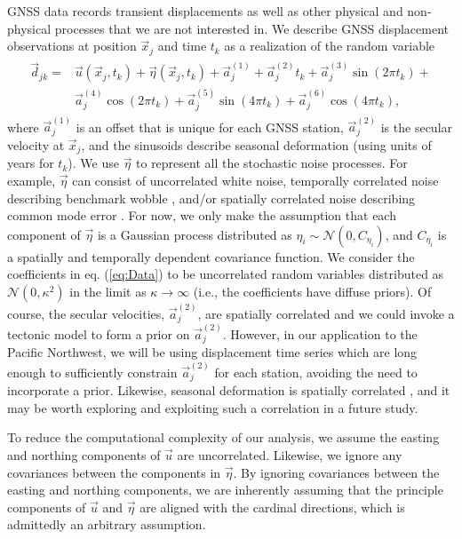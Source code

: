 \documentclass[extra,mreferee]{gji}
\begin{document}
GNSS data records transient displacements as well as other physical and non-physical processes that we are not interested in. We describe GNSS displacement observations at position $\vec{x}_j$ and time $t_k$ as a realization of the random variable 
\begin{align}\label{eq:Data}
\begin{split}
\vec{d}_{jk} = &\vec{u}(\vec{x}_j,t_k) + \vec{\eta}(\vec{x}_j,t_k) + \vec{a}^{(1)}_j + \vec{a}^{(2)}_jt_k + \vec{a}^{(3)}_j\sin(2 \pi t_k) + \\ 
               &\vec{a}^{(4)}_j\cos(2 \pi t_k) + \vec{a}^{(5)}_j\sin(4 \pi t_k) + \vec{a}^{(6)}_j\cos(4 \pi t_k), 
\end{split}
\end{align}
where $\vec{a}^{(1)}_j$ is an offset that is unique for each GNSS station, $\vec{a}^{(2)}_j$ is the secular velocity at $\vec{x}_j$, and the sinusoids describe seasonal deformation (using units of years for $t_k$). We use $\vec{\eta}$ to represent all the stochastic noise processes. For example, $\vec{\eta}$ can consist of uncorrelated white noise, temporally correlated noise describing benchmark wobble \citep[e.g.,][]{Wyatt1982,Wyatt1989}, and/or spatially correlated noise describing common mode error \citep[e.g.,][]{Wdowinski1997}. For now, we only make the assumption that each component of $\vec{\eta}$ is a Gaussian process distributed as $\eta_i \sim \mathcal{N}(0,C_{\eta_i})$, and $C_{\eta_i}$ is a spatially and temporally dependent covariance function. We consider the coefficients in eq. (\ref{eq:Data}) to be uncorrelated random variables distributed as $\mathcal{N}(0,\kappa^2)$ in the limit as $\kappa \to \infty$ (i.e., the coefficients have diffuse priors). Of course, the secular velocities, $\vec{a}^{(2)}_j$, are spatially correlated and we could invoke a tectonic model to form a prior on $\vec{a}^{(2)}_j$. However, in our application to the Pacific Northwest, we will be using displacement time series which are long enough to sufficiently constrain $\vec{a}^{(2)}_j$ for each station, avoiding the need to incorporate a prior. Likewise, seasonal deformation is spatially correlated \citep{Dong2002,Langbein2008}, and it may be worth exploring and exploiting such a correlation in a future study. 

To reduce the computational complexity of our analysis, we assume the easting and northing components of $\vec{u}$ are uncorrelated. Likewise, we ignore any covariances between the components in $\vec{\eta}$. By ignoring covariances between the easting and northing components, we are inherently assuming that the principle components of $\vec{u}$ and $\vec{\eta}$ are aligned with the cardinal directions, which is admittedly an arbitrary assumption.      
\end{document}
